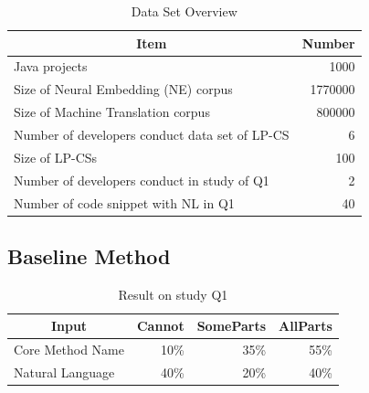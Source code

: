 \documentclass[sigconf,review,anonymous]{article}
\begin{document}
\begin{table}[]
\caption{Data Set Overview}
\label{tbl:datasetOverview}
\centering
\begin{tabular}{|l|r|}
\hline
\multicolumn{1}{|c|}{\textbf{Item}}                & \multicolumn{1}{c|}{\textbf{Number}} \\ \hline
Java projects                                      & 1000                                 \\ \hline
Size of Neural Embedding (NE) corpus               & 1770000                              \\ \hline
Size of Machine Translation corpus                 & 800000                                                               \\ \hline
Number of developers conduct data set of LP-CS        & 6                                    \\ \hline
Size of LP-CSs & 100                                  \\ \hline
Number of developers conduct in study of Q1        & 2                                    \\ \hline
Number of code snippet with NL in Q1               & 40                                   \\ \hline
\end{tabular}
\end{table}
\subsection{Baseline Method}

\begin{table}[]
\caption{Result on study Q1}
\label{tbl:StudyQ1}
\centering
\begin{tabular}{|l|r|r|r|}
\hline
\multicolumn{1}{|c|}{\textbf{Input}} & \multicolumn{1}{l|}{\textbf{Cannot}} & \multicolumn{1}{l|}{\textbf{SomeParts}} & \multicolumn{1}{l|}{\textbf{AllParts}} \\ \hline
Core Method Name                     & 10\%                                 & 35\%                                    & 55\%                                   \\ \hline
Natural Language                     & 40\%                                 & 20\%                                    & 40\%                                   \\ \hline
\end{tabular}
\end{table}
\end{document}
